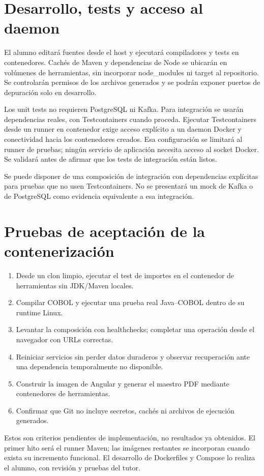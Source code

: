 \section{Desarrollo, tests y acceso al daemon}
El alumno editará fuentes desde el host y ejecutará compiladores y tests en contenedores. Cachés de Maven y dependencias de Node se ubicarán en volúmenes de herramientas, sin incorporar node\_modules ni target al repositorio. Se controlarán permisos de los archivos generados y se podrán exponer puertos de depuración solo en desarrollo.

Los unit tests no requieren PostgreSQL ni Kafka. Para integración se usarán dependencias reales, con Testcontainers cuando proceda. Ejecutar Testcontainers desde un runner en contenedor exige acceso explícito a un daemon Docker y conectividad hacia los contenedores creados. Esa configuración se limitará al runner de pruebas; ningún servicio de aplicación necesita acceso al socket Docker. Se validará antes de afirmar que los tests de integración están listos.

Se puede disponer de una composición de integración con dependencias explícitas para pruebas que no usen Testcontainers. No se presentará un mock de Kafka o de PostgreSQL como evidencia equivalente a esa integración.

\section{Pruebas de aceptación de la contenerización}
\begin{enumerate}
\item Desde un clon limpio, ejecutar el test de importes en el contenedor de herramientas sin JDK/Maven locales.
\item Compilar COBOL y ejecutar una prueba real Java--COBOL dentro de su runtime Linux.
\item Levantar la composición con healthchecks; completar una operación desde el navegador con URLs correctas.
\item Reiniciar servicios sin perder datos duraderos y observar recuperación ante una dependencia temporalmente no disponible.
\item Construir la imagen de Angular y generar el maestro PDF mediante contenedores de herramientas.
\item Confirmar que Git no incluye secretos, cachés ni archivos de ejecución generados.
\end{enumerate}

Estos son criterios pendientes de implementación, no resultados ya obtenidos. El primer hito será el runner Maven; las imágenes restantes se incorporan cuando exista su incremento funcional. El desarrollo de Dockerfiles y Compose lo realiza el alumno, con revisión y pruebas del tutor.


